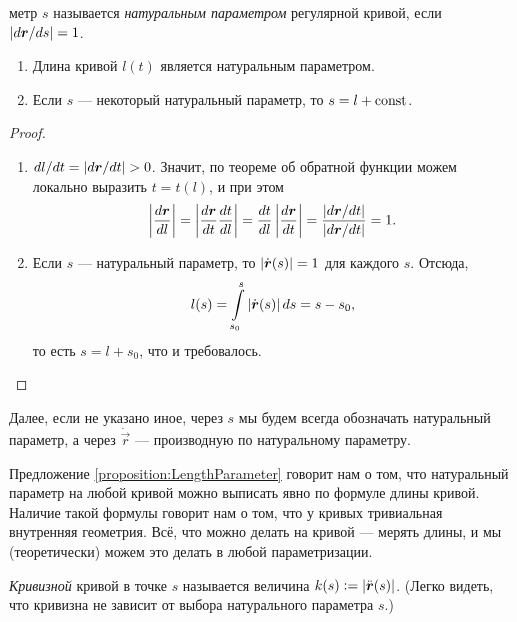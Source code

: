 \begin{definition}
	метр $s$ называется \textit{натуральным параметром} регулярной кривой, если $\left\lvert d\boldsymbol{r} / ds\right\rvert = 1$.
\end{definition}

\begin{proposition} \label{proposition:LengthParameter}
	\begin{enumerate}[nolistsep, label=(\arabic*)]
		\item Длина кривой $l(t)$ является натуральным параметром.
		\item Если $s$ --- некоторый натуральный параметр, то $s = l + \mathrm{const}$.
	\end{enumerate}
\end{proposition}

\begin{proof}
	\begin{enumerate}[nolistsep, label=(\arabic*)]
		\item $dl / dt = \left\lvert d\boldsymbol{r} / dt\right\rvert > 0$. Значит, по теореме об обратной функции можем локально выразить $t = t(l)$, и при этом
			\[
				\left\lvert\frac{d\boldsymbol{r}}{dl}\right\rvert = \left\lvert\frac{d\boldsymbol{r}}{dt}\frac{dt}{dl}\right\rvert = \frac{dt}{dl}\left\lvert\frac{d\boldsymbol{r}}{dt}\right\rvert = \frac{\left\lvert d\boldsymbol{r} / dt\right\rvert}{\left\lvert d\boldsymbol{r} / dt\right\rvert} = 1.
			\]
		\item Если $s$ --- натуральный параметр, то $\left\lvert\dot{\boldsymbol{r}}(s)\right\rvert = 1$ для каждого $s$. Отсюда,
			\[
				l(s) = \int\limits_{s_0}^s\left\lvert\dot{\boldsymbol{r}}(s)\right\rvert ds = s - s_0,
			\]
			то есть $s = l + s_0$, что и требовалось.
	\end{enumerate}
\end{proof}

Далее, если не указано иное, через $s$ мы будем всегда обозначать натуральный параметр, а через $\dot{\vec{r}}$ --- производную по натуральному параметру.

Предложение \ref{proposition:LengthParameter} говорит нам о том, что натуральный параметр на любой кривой можно выписать явно по формуле длины кривой. Наличие такой формулы говорит нам о том, что у кривых тривиальная внутренняя геометрия. Всё, что можно делать на кривой --- мерять длины, и мы (теоретически) можем это делать в любой параметризации.

\begin{definition}
	\textit{Кривизной} кривой в точке $s$ называется величина $k(s) \vcentcolon = \left\lvert\ddot{\boldsymbol{r}}(s)\right\rvert$. (Легко видеть, что кривизна не зависит от выбора натурального параметра $s$.)
\end{definition}

